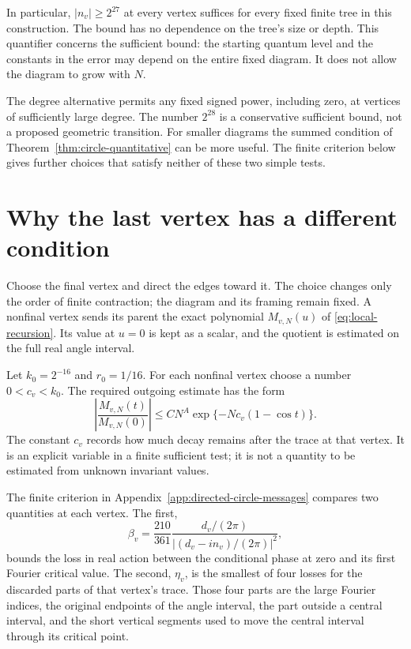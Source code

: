 In particular, $|n_v|\ge2^{27}$ at every vertex suffices for every fixed
finite tree in this construction. The bound has no dependence on the
tree's size or depth. This quantifier concerns the sufficient bound:
the starting quantum level and the constants in the error may depend
on the entire fixed diagram. It does not allow the diagram to grow
with $N$.

The degree alternative permits any fixed signed power, including zero,
at vertices of sufficiently large degree. The number $2^{28}$ is a
conservative sufficient bound, not a proposed geometric transition.
For smaller diagrams the summed condition of
Theorem~\ref{thm:circle-quantitative} can be more useful. The finite
criterion below gives further choices that satisfy neither of these
two simple tests.

\section{Why the last vertex has a different condition}

Choose the final vertex and direct the edges toward it. The choice
changes only the order of finite contraction; the diagram and its
framing remain fixed.
A nonfinal vertex sends its parent the exact polynomial
$M_{v,N}(u)$ of \eqref{eq:local-recursion}. Its value at $u=0$ is
kept as a scalar, and the quotient is estimated on the full real
angle interval.

Let $k_0=2^{-16}$ and $r_0=1/16$. For each nonfinal vertex choose
a number $0<c_v<k_0$. The required outgoing estimate has the form
\[
 \left|\frac{M_{v,N}(t)}{M_{v,N}(0)}\right|
     \le C N^A \exp\{-Nc_v(1-\cos t)\}.
\]
The constant $c_v$ records how much decay remains after the trace at
that vertex. It is an explicit variable in a finite sufficient test;
it is not a quantity to be estimated from unknown invariant values.

The finite criterion in Appendix~\ref{app:directed-circle-messages}
compares two quantities at each vertex. The first,
\[
 \beta_v=\frac{210}{361}
       \frac{d_v/(2\pi)}{|(d_v-in_v)/(2\pi)|^2},
\]
bounds the loss in real action between the conditional phase at zero
and its first Fourier critical value. The second, $\eta_v$, is the
smallest of four losses for the discarded parts of that vertex's
trace. Those four parts are the large Fourier indices, the original
endpoints of the angle interval, the part outside a central interval,
and the short vertical segments used to move the central interval
through its critical point.

